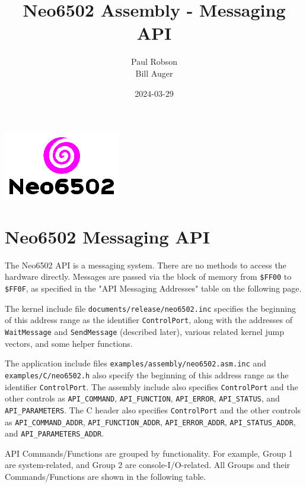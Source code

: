 \documentclass[12pt]{article}
\title{Neo6502 Assembly - Messaging API}
\author{Paul Robson \\ Bill Auger}
\date{2024-03-29}
\newcommand{\MonoSp}[1] {\fontsize{10pt}{10pt}\selectfont\texttt{#1}\normalsize}
\begin{document}
\maketitle

\begin{center}
  \includegraphics[scale=2.0]{neo6502-text-logo.png}
\end{center}

\tableofcontents


\pagebreak


\section{Neo6502 Messaging API}\label{api}

The Neo6502 API is a messaging system.
There are no methods to access the hardware directly.
Messages are passed via the block of memory from \MonoSp{\$FF00} to \MonoSp{\$FF0F},
as specified in the "API Messaging Addresses" table on the following page.
\newline

The kernel include file \MonoSp{documents/release/neo6502.inc}
specifies the beginning of this address range as the identifier \MonoSp{ControlPort},
along with the addresses of \MonoSp{WaitMessage} and \MonoSp{SendMessage} (described later),
various related kernel jump vectors, and some helper functions.
\newline

The application include files \MonoSp{examples/assembly/neo6502.asm.inc}
and \MonoSp{examples/C/neo6502.h}
also specify the beginning of this address range as the identifier \MonoSp{ControlPort}.
The assembly include also specifies \MonoSp{ControlPort} and the other controls as
\MonoSp{API\_COMMAND}, \MonoSp{API\_FUNCTION}, \MonoSp{API\_ERROR},
\MonoSp{API\_STATUS}, and \MonoSp{API\_PARAMETERS}.
The C header also specifies \MonoSp{ControlPort} and the other controls as
\MonoSp{API\_COMMAND\_ADDR}, \MonoSp{API\_FUNCTION\_ADDR},
\MonoSp{API\_ERROR\_ADDR}, \MonoSp{API\_STATUS\_ADDR},
and \MonoSp{API\_PARAMETERS\_ADDR}.
\newline

API Commands/Functions are grouped by functionality.
For example, Group 1 are system-related, and Group 2 are console-I/O-related.
All Groups and their Commands/Functions are shown in the following table.
\newline
\end{document}
